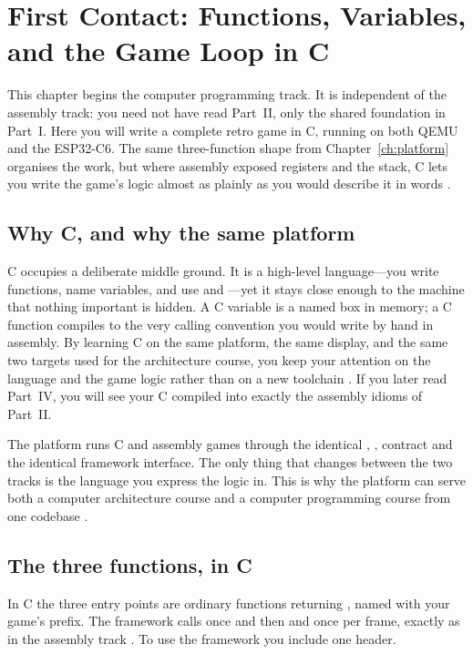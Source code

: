 \chapter{First Contact: Functions, Variables, and the Game Loop in C}
\label{ch:c1}

This chapter begins the computer programming track. It is independent of the
assembly track: you need not have read Part~II, only the shared foundation in
Part~I. Here you will write a complete retro game in C, running on both QEMU and
the ESP32\nobreakdash-C6. The same three-function shape from Chapter~\ref{ch:platform}
organises the work, but where assembly exposed registers and the stack, C lets you
write the game's logic almost as plainly as you would describe it in words
\citep{prg32tutorialc}.

\section{Why C, and why the same platform}

C occupies a deliberate middle ground. It is a high-level language---you write
functions, name variables, and use  and ---yet it stays close
enough to the machine that nothing important is hidden. A C variable is a named
box in memory; a C function compiles to the very calling convention you would
write by hand in assembly. By learning C on the same platform, the same display,
and the same two targets used for the architecture course, you keep your attention
on the language and the game logic rather than on a new toolchain
\citep{prg32teaching}. If you later read Part~IV, you will see your C compiled into
exactly the assembly idioms of Part~II.

\begin{prgconcept}
The platform runs C and assembly games through the identical ,
,  contract and the identical framework interface. The
only thing that changes between the two tracks is the language you express the
logic in. This is why the platform can serve both a computer architecture course
and a computer programming course from one codebase \citep{prg32teaching}.
\end{prgconcept}

\section{The three functions, in C}

In C the three entry points are ordinary functions returning , named
with your game's prefix. The framework calls  once and then
 and  once per frame, exactly as in the
assembly track \citep{prg32tutorialc}. To use the framework you include one header.

